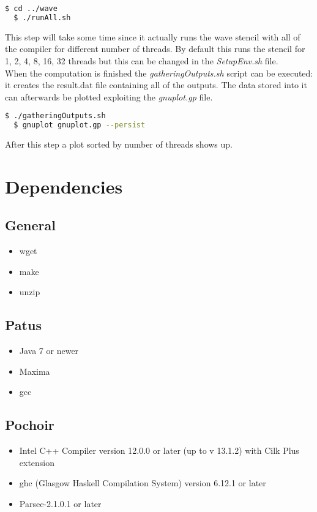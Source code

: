 \documentclass[AEJ]{AEA}
\begin{document}
\begin{lstlisting}[frame=single,language=bash]
  $ cd ../wave
  $ ./runAll.sh
\end{lstlisting}

This step will take some time since it actually runs the wave stencil with all of the compiler for different number of threads. By default this runs the stencil for 1, 2, 4, 8, 16, 32 threads but this can be changed in the \emph{SetupEnv.sh} file.
\\
When the computation is finished the \emph{gatheringOutputs.sh} script can be executed: it creates the result.dat file containing all of the outputs. The data stored into it can afterwards be plotted exploiting the \emph{gnuplot.gp} file.

\begin{lstlisting}[frame=single,language=bash]
  $ ./gatheringOutputs.sh
  $ gnuplot gnuplot.gp --persist
\end{lstlisting}

After this step a plot sorted by number of threads shows up.
\newpage
\section{Dependencies}
\subsection{General}
\begin{itemize}
	\item wget
	\item make
	\item unzip
\end{itemize}

\subsection{Patus}
\begin{itemize}
	\item Java 7 or newer
	\item Maxima
	\item gcc
\end{itemize}
\subsection{Pochoir}

\begin{itemize}
	\item Intel C++ Compiler version 12.0.0 or later (up to v 13.1.2) with Cilk Plus extension
	\item ghc (Glasgow Haskell Compilation System) version 6.12.1 or later
	\item Parsec-2.1.0.1 or later
\end{itemize}
\end{document}
